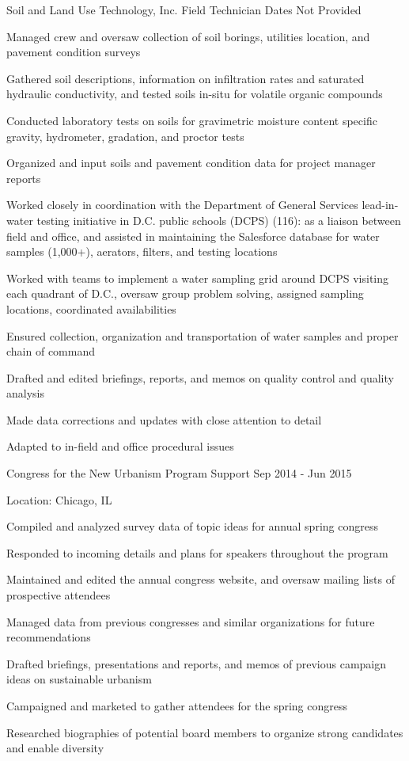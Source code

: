 \documentclass{../styles/cv}
\begin{document}
\subsectionpositiondate
    {Soil and Land Use Technology, Inc.}
    {Field Technician}
    {Dates Not Provided}
\resumesublistbegin
    \item Managed crew and oversaw collection of soil borings, utilities location, and pavement condition surveys
    \item Gathered soil descriptions, information on infiltration rates and saturated hydraulic conductivity, and tested soils in-situ for volatile organic compounds
    \item Conducted laboratory tests on soils for gravimetric moisture content specific gravity, hydrometer, gradation, and proctor tests
    \item Organized and input soils and pavement condition data for project manager reports
    \item Worked closely in coordination with the Department of General Services lead-in-water testing initiative in D.C. public schools (DCPS) (116): as a liaison between field and office, and assisted in maintaining the Salesforce database for water samples (1,000+), aerators, filters, and testing locations
    \item Worked with teams to implement a water sampling grid around DCPS visiting each quadrant of D.C., oversaw group problem solving, assigned sampling locations, coordinated availabilities
    \item Ensured collection, organization and transportation of water samples  and proper chain of command
    \item Drafted and edited briefings, reports, and memos on quality control and quality analysis
    \item Made data corrections and updates with close attention to detail
    \item Adapted to in-field and office procedural issues
\resumesublistend

\subsectionpositiondate
    {Congress for the New Urbanism}
    {Program Support}
    {Sep 2014 - Jun 2015}
\resumesublistbegin
    \item Location: Chicago, IL
    \item Compiled and analyzed survey data of topic ideas for annual spring congress
    \item Responded to incoming details and plans for speakers throughout the program
    \item Maintained and edited the annual congress website, and oversaw mailing lists of prospective attendees
    \item Managed data from previous congresses and similar organizations for future recommendations
    \item Drafted briefings, presentations and reports, and memos of previous campaign ideas on sustainable urbanism
    \item Campaigned and marketed to gather attendees for the spring congress
    \item Researched biographies of potential board members to organize strong candidates and enable diversity
\resumesublistend
\end{document}
